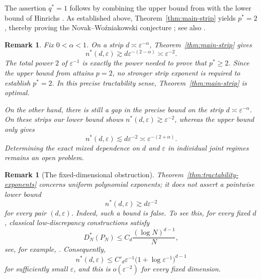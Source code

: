 \documentclass[10pt,a4paper]{amsart}
\newtheorem{remark}[theorem]{Remark}
\newcommand{\1}{\mathbf{1}}
\begin{document}
The assertion \(q^\ast=1\) follows by combining the upper bound from
\cite{HNWW01} with the lower bound of Hinrichs \cite{H04}.
As established above, Theorem~\ref{thm:main-strip} yields \(p^\ast=2\),
thereby proving the Novak--Wo\'{z}niakowski conjecture
\cite[p.~63]{NW10}; see also \cite[Problem~3]{H03}.



\begin{remark}\label{rem:strip-optimality}
Fix \(0<\alpha<1\).  On a strip \(d\asymp\varepsilon^{-\alpha}\), Theorem~\ref{thm:main-strip} gives
\[
 n^{\ast}(d,\varepsilon)
 \gtrsim d\varepsilon^{-(2-\alpha)}
 \asymp\varepsilon^{-2}.
\]
The total power \(2\) of \(\varepsilon^{-1}\) is exactly the power needed to prove that $p^\ast \ge 2$. Since the upper bound from \cite{HNWW01} attains \(p=2\), no stronger strip exponent is required to establish \(p^{\ast}=2\).  In this precise tractability sense, Theorem~\ref{thm:main-strip} is optimal.

On the other hand, there is still a gap in the precise bound on the strip $d \asymp \varepsilon^{-\alpha}$. On these strips our lower bound shows $n^\ast(d, \varepsilon) \gtrsim \varepsilon^{-2}$, whereas the upper bound only gives
\begin{equation*}
n^\ast(d,\varepsilon) \lesssim d\varepsilon^{-2} \asymp \varepsilon^{-(2+\alpha)}.
\end{equation*}
Determining the exact mixed dependence on \(d\) and \(\varepsilon\) in individual joint regimes remains an open problem.
\end{remark}

\begin{remark}[The fixed-dimensional obstruction]\label{rem:fixed-d-obstruction}
Theorem~\ref{thm:tractability-exponents} concerns uniform polynomial exponents; it does not assert a pointwise lower bound
\[
 n^{\ast}(d,\varepsilon)\gtrsim d\varepsilon^{-2}
\]
for every pair \((d,\varepsilon)\). Indeed, such a bound is false. To see this, for every fixed \(d\), classical low-discrepancy constructions satisfy
\[
 D_N^{\ast}(P_N)
 \le C_d\frac{(\log N)^{d-1}}N,
\]
see, for example, \cite{DP10}.  Consequently,
\[
 n^{\ast}(d,\varepsilon)
 \le C'_d\varepsilon^{-1}
 \bigl(1+\log\varepsilon^{-1}\bigr)^{d-1}
\]
for sufficiently small \(\varepsilon\), and this is \(o(\varepsilon^{-2})\) for every fixed dimension. 
\end{remark}
\end{document}
